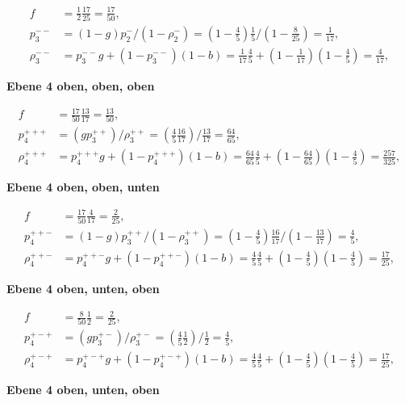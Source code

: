 \documentclass[fleqn]{article}
\begin{document}
\begin{enumerate}[a)]
$$
\begin{aligned}
    f&=\frac{1}{2} \frac{17}{25} = \frac{17}{50} ,\\
    p_{3}^{--}&=(1-g) p_2^{-} / (1- \rho_2^{-}) = \left(1-\frac{4}{5}\right) \frac{1}{5} / \left(1 -\frac{8}{25}\right) = \frac{1}{17}, \\
    \rho_{3}^{--}&= p_{3}^{--} g+\left(1-p_{3}^{--}\right)(1-b) = \frac{1}{17} \frac{4}{5}+\left(1- \frac{1}{17}\right) \left(1- \frac{4}{5}\right)=\frac{4}{17},
\end{aligned}
$$

\textbf{Ebene 4 oben, oben, oben}

$$
\begin{aligned}
    f&=\frac{17}{50} \frac{13}{17} = \frac{13}{50},\\
    p_{4}^{+++}&=(g p_3^{++})/ \rho_3^{++} = \left(\frac{4}{5} \frac{16}{17}\right) / \frac{13}{17} = \frac{64}{65}, \\
    \rho_{4}^{+++}&= p_{4}^{+++} g+\left(1-p_{4}^{+++}\right)(1-b) = \frac{64}{65} \frac{4}{5}+\left(1- \frac{64}{65}\right) \left(1- \frac{4}{5}\right)=\frac{257}{325},
\end{aligned}
$$

\textbf{Ebene 4 oben, oben, unten}

$$
\begin{aligned}
    f&=\frac{17}{50} \frac{4}{17} = \frac{2}{25} ,\\
    p_{4}^{++-}&=(1-g) p_3^{++} / (1- \rho_3^{++}) = \left(1-\frac{4}{5}\right) \frac{16}{17} / \left(1 -\frac{13}{17}\right) = \frac{4}{5}, \\
    \rho_{4}^{++-}&= p_{4}^{++-} g+\left(1-p_{4}^{++-}\right)(1-b) = \frac{4}{5} \frac{4}{5}+\left(1- \frac{4}{5}\right) \left(1- \frac{4}{5}\right)=\frac{17}{25},
\end{aligned}
$$

\textbf{Ebene 4 oben, unten, oben}

$$
\begin{aligned}
    f&=\frac{8}{50} \frac{1}{2} = \frac{2}{25} ,\\
    p_{4}^{+-+}&=\left(g p_3^{+-}\right) / \rho_3^{+-} = \left(\frac{4}{5} \frac{1}{2} \right) / \frac{1}{2} = \frac{4}{5}, \\
    \rho_{4}^{+-+}&= p_{4}^{+-+} g+\left(1-p_{4}^{+-+}\right)(1-b) = \frac{4}{5} \frac{4}{5}+\left(1- \frac{4}{5}\right) \left(1- \frac{4}{5}\right)=\frac{17}{25},
\end{aligned}
$$

\textbf{Ebene 4 oben, unten, oben}


\end{enumerate}
\end{document}
